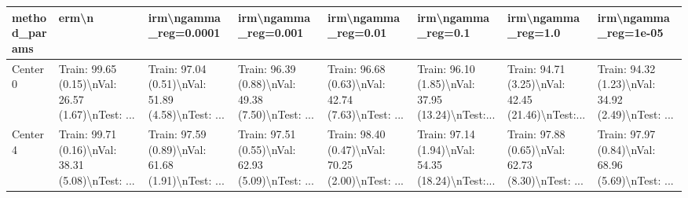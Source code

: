 \begin{tabular}{llllllll}
\toprule
method\_params &                                              erm\textbackslash n &                              irm\textbackslash ngamma\_reg=0.0001 &                               irm\textbackslash ngamma\_reg=0.001 &                                irm\textbackslash ngamma\_reg=0.01 &                                 irm\textbackslash ngamma\_reg=0.1 &                                 irm\textbackslash ngamma\_reg=1.0 &                               irm\textbackslash ngamma\_reg=1e-05 \\
\midrule
Center 0 &  Train: 99.65 (0.15)\textbackslash nVal: 26.57 (1.67)\textbackslash nTest: ... &  Train: 97.04 (0.51)\textbackslash nVal: 51.89 (4.58)\textbackslash nTest: ... &  Train: 96.39 (0.88)\textbackslash nVal: 49.38 (7.50)\textbackslash nTest: ... &  Train: 96.68 (0.63)\textbackslash nVal: 42.74 (7.63)\textbackslash nTest: ... &  Train: 96.10 (1.85)\textbackslash nVal: 37.95 (13.24)\textbackslash nTest:... &  Train: 94.71 (3.25)\textbackslash nVal: 42.45 (21.46)\textbackslash nTest:... &  Train: 94.32 (1.23)\textbackslash nVal: 34.92 (2.49)\textbackslash nTest: ... \\
Center 4 &  Train: 99.71 (0.16)\textbackslash nVal: 38.31 (5.08)\textbackslash nTest: ... &  Train: 97.59 (0.89)\textbackslash nVal: 61.68 (1.91)\textbackslash nTest: ... &  Train: 97.51 (0.55)\textbackslash nVal: 62.93 (5.09)\textbackslash nTest: ... &  Train: 98.40 (0.47)\textbackslash nVal: 70.25 (2.00)\textbackslash nTest: ... &  Train: 97.14 (1.94)\textbackslash nVal: 54.35 (18.24)\textbackslash nTest:... &  Train: 97.88 (0.65)\textbackslash nVal: 62.73 (8.30)\textbackslash nTest: ... &  Train: 97.97 (0.84)\textbackslash nVal: 68.96 (5.69)\textbackslash nTest: ... \\
\bottomrule
\end{tabular}
